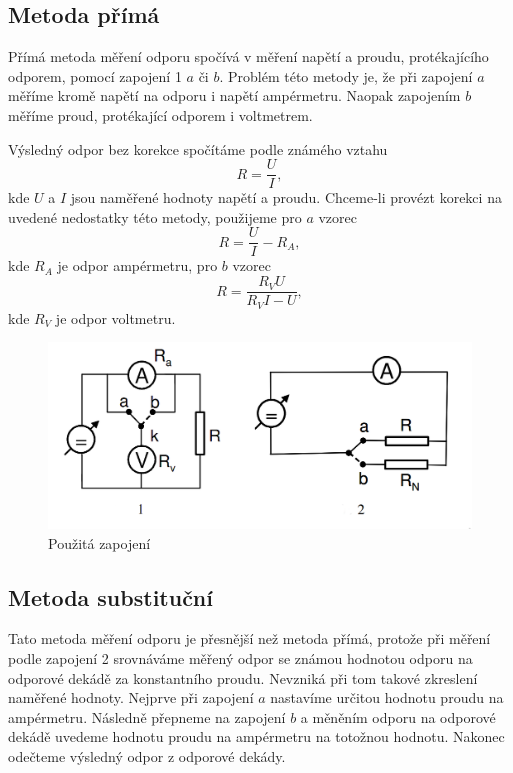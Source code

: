 \documentclass[0-protokol.tex]{subfiles}
\begin{document}
\subsection*{Metoda přímá}
Přímá metoda měření odporu spočívá v měření napětí a proudu, protékajícího odporem, pomocí zapojení 1 $a$ či $b$. Problém této metody je, že při zapojení $a$ měříme kromě napětí na odporu i napětí ampérmetru. Naopak zapojením $b$ měříme proud, protékající odporem i voltmetrem. 

Výsledný odpor bez korekce spočítáme podle známého vztahu
\begin{equation}
R = \frac{U}{I},
\end{equation}
kde $U$ a $I$ jsou naměřené hodnoty napětí a proudu. Chceme-li provézt korekci na uvedené nedostatky této metody, použijeme pro $a$ vzorec
\begin{equation}
R = \frac{U}{I}  - R_A,
\end{equation}
kde $R_A$ je odpor ampérmetru, pro $b$ vzorec
\begin{equation}
R = \frac{R_V U}{R_V I - U},
\end{equation}
kde $R_V$ je odpor voltmetru.

\begin{figure}[H] \label{fig:zap1_2}
\centering
\includegraphics[scale=0.4]{plot/zap1_2}
\caption{Použitá zapojení \cite{stud_text}}
\end{figure}

\subsection*{Metoda substituční}
Tato metoda měření odporu je přesnější než metoda přímá, protože při měření podle zapojení 2 srovnáváme měřený odpor se známou hodnotou odporu na odporové dekádě za konstantního proudu. Nevzniká při tom takové zkreslení naměřené hodnoty. Nejprve při zapojení $a$ nastavíme určitou hodnotu proudu na ampérmetru. Následně přepneme na zapojení $b$ a měněním odporu na odporové dekádě uvedeme hodnotu proudu na ampérmetru na totožnou hodnotu. Nakonec odečteme výsledný odpor z odporové dekády.
\end{document}
